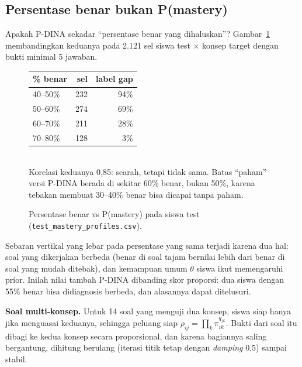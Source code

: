\documentclass[11pt,a4paper]{article}
\begin{document}
\subsection{Persentase benar bukan P(mastery)}

Apakah P-DINA sekadar ``persentase benar yang dihaluskan''? Gambar~\ref{fig:pcpi} membandingkan keduanya pada 2.121 sel
siswa test $\times$ konsep target dengan bukti minimal 5 jawaban.

\begin{figure}[h]
  \centering
  \setlength\figH{5.4cm}
  \begin{minipage}[c]{0.55\linewidth}\end{minipage}\hfill
  \begin{minipage}[c]{0.42\linewidth}\small
    \begin{tabular}{@{}lrr@{}}
      \toprule
      \% benar & sel & label gap \\
      \midrule
      40--50\% & 232 & 94\% \\
      50--60\% & 274 & 69\% \\
      60--70\% & 211 & 28\% \\
      70--80\% & 128 & 3\% \\
      \bottomrule
    \end{tabular}\\[4pt]
    Korelasi keduanya 0,85: searah, tetapi tidak sama. Batas ``paham'' versi P-DINA berada di sekitar 60\%
    benar, bukan 50\%, karena tebakan membuat 30--40\% benar bisa dicapai tanpa paham.
  \end{minipage}
  \caption{Persentase benar vs P(mastery) pada siswa test (\texttt{test\_mastery\_profiles.csv}).}
  \label{fig:pcpi}
\end{figure}

Sebaran vertikal yang lebar pada persentase yang sama terjadi karena dua hal: soal yang dikerjakan berbeda (benar di
soal tajam bernilai lebih dari benar di soal yang mudah ditebak), dan kemampuan umum $\theta$ siswa ikut
memengaruhi prior. Inilah nilai tambah P-DINA dibanding skor proporsi: dua siswa dengan 55\% benar bisa didiagnosis
berbeda, dan alasannya dapat ditelusuri.

\textbf{Soal multi-konsep.} Untuk 14 soal yang menguji dua konsep, siswa siap hanya jika menguasai keduanya, sehingga
peluang siap $\rho_{ij}=\prod_k\pi_{ik}^{q_{jk}}$. Bukti dari soal itu dibagi ke kedua konsep secara proporsional, dan
karena bagiannya saling bergantung, dihitung berulang (iterasi titik tetap dengan \emph{damping} 0,5) sampai stabil.
\end{document}
